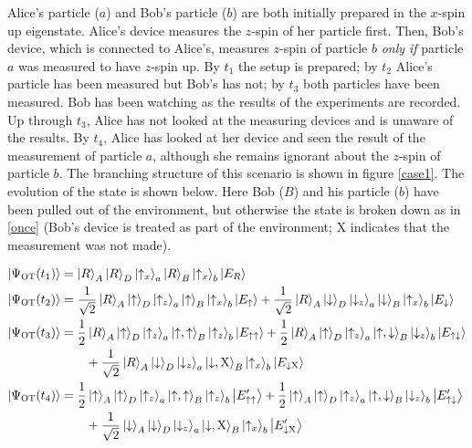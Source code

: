 \documentclass[onecolumn,secnumarabic,amsmath,amssymb,balancelastpage,nofootinbib]{article}
\newcommand{\ket}[1]{\ensuremath{\left|#1\right\rangle}}
\begin{document}
\begin{description}[font=\normalfont\scshape]
\item[Once-or-Twice] Alice's particle ($a$) and Bob's particle ($b$) are both initially prepared in the $x$-spin up eigenstate.  Alice's device measures the $z$-spin of her particle first.  Then, Bob's device, which is connected to Alice's, measures $z$-spin of particle $b$ \emph{only if} particle $a$ was measured to have $z$-spin up.  By $t_1$ the setup is prepared; by $t_2$ Alice's particle has been measured but Bob's has not; by $t_3$ both particles have been measured. Bob has been watching as the results of the experiments are recorded.  Up through $t_3$, Alice has not looked at the measuring devices and is unaware of the results.  By $t_4$, Alice has looked at her device and seen the result of the measurement of particle $a$, although she remains ignorant about the $z$-spin of particle $b$.  The branching structure of this scenario is shown in figure \ref{case1}.  The evolution of the state is shown below.  Here Bob ($B$) and {his }particle {($b$)} have been pulled out of the environment, but otherwise the state is broken down as in \eqref{once} (Bob's device is treated as part of the environment; $\text{X}$ indicates that the measurement was not made).

\begin{align}
\ket{\Psi_{\textsc{OT}}(t_1)}&=\ket{R}_A\ket{R}_{D}\ket{\uparrow_x}_a\ket{R}_B\ket{\uparrow_x}_b\ket{E_{R}}
\nonumber
\\
\ket{\Psi_{\textsc{OT}}(t_2)}&=\frac{1}{\sqrt{2}}\ket{R}_A\ket{\uparrow}_{D}\ket{\uparrow_z}_a\ket{\uparrow}_B\ket{\uparrow_x}_b\ket{E_{\uparrow}}+\frac{1}{\sqrt{2}}\ket{R}_A\ket{\downarrow}_{D}\ket{\downarrow_z}_a\ket{\downarrow}_B\ket{\uparrow_x}_b\ket{E_{\downarrow}}
\nonumber
\\
\ket{\Psi_{\textsc{OT}}(t_3)}&=\frac{1}{2}\ket{R}_A\ket{\uparrow}_{D}\ket{\uparrow_z}_a\ket{\uparrow,\uparrow}_B\ket{\uparrow_z}_b\ket{E_{\uparrow\uparrow}}+\frac{1}{2}\ket{R}_A\ket{\uparrow}_{D}\ket{\uparrow_z}_a\ket{\uparrow,\downarrow}_B\ket{\downarrow_z}_b\ket{E_{\uparrow\downarrow}}
\nonumber
\\
&\qquad +\frac{1}{\sqrt{2}}\ket{R}_A\ket{\downarrow}_{D}\ket{\downarrow_z}_a\ket{\downarrow,\text{X}}_B\ket{\uparrow_x}_b\ket{E_{\downarrow\text{X}}}
\nonumber
\\
\ket{\Psi_{\textsc{OT}}(t_4)}&=\frac{1}{2}\ket{\uparrow}_A\ket{\uparrow}_{D}\ket{\uparrow_z}_a\ket{\uparrow,\uparrow}_B\ket{\uparrow_z}_b\ket{E_{\uparrow\uparrow}'}+\frac{1}{2}\ket{\uparrow}_A\ket{\uparrow}_{D}\ket{\uparrow_z}_a\ket{\uparrow,\downarrow}_B\ket{\downarrow_z}_b\ket{E_{\uparrow\downarrow}'}
\nonumber
\\
&\qquad+\frac{1}{\sqrt{2}}\ket{\downarrow}_A\ket{\downarrow}_{D}\ket{\downarrow_z}_a\ket{\downarrow,\text{X}}_B\ket{\uparrow_x}_b\ket{E_{\downarrow\text{X}}'}
\label{onceortwice}
\end{align}
\end{description}
\end{document}
